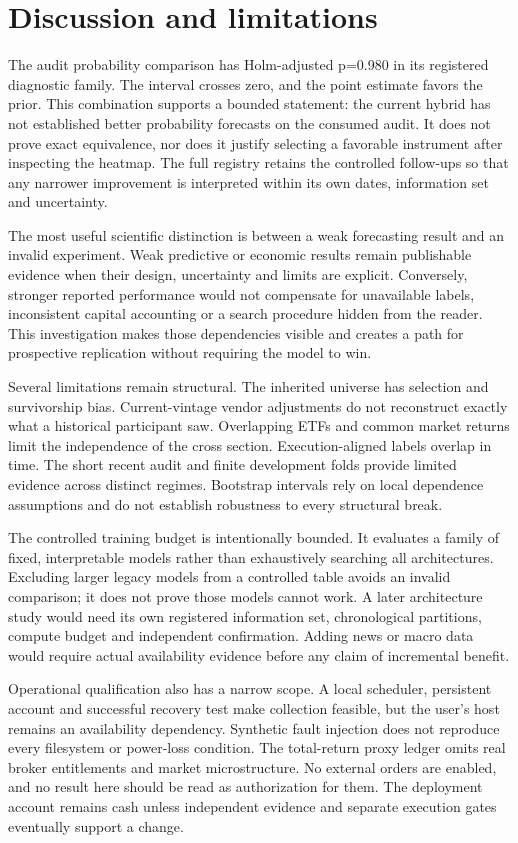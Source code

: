 \section{Discussion and limitations}\label{sec:section-11}

The audit probability comparison has Holm-adjusted p=0.980 in its registered diagnostic family. The interval crosses zero, and the point estimate favors the prior. This combination supports a bounded statement: the current hybrid has not established better probability forecasts on the consumed audit. It does not prove exact equivalence, nor does it justify selecting a favorable instrument after inspecting the heatmap. The full registry retains the controlled follow-ups so that any narrower improvement is interpreted within its own dates, information set and uncertainty.

The most useful scientific distinction is between a weak forecasting result and an invalid experiment. Weak predictive or economic results remain publishable evidence when their design, uncertainty and limits are explicit. Conversely, stronger reported performance would not compensate for unavailable labels, inconsistent capital accounting or a search procedure hidden from the reader. This investigation makes those dependencies visible and creates a path for prospective replication without requiring the model to win.

Several limitations remain structural. The inherited universe has selection and survivorship bias. Current-vintage vendor adjustments do not reconstruct exactly what a historical participant saw. Overlapping ETFs and common market returns limit the independence of the cross section. Execution-aligned labels overlap in time. The short recent audit and finite development folds provide limited evidence across distinct regimes. Bootstrap intervals rely on local dependence assumptions and do not establish robustness to every structural break.

The controlled training budget is intentionally bounded. It evaluates a family of fixed, interpretable models rather than exhaustively searching all architectures. Excluding larger legacy models from a controlled table avoids an invalid comparison; it does not prove those models cannot work. A later architecture study would need its own registered information set, chronological partitions, compute budget and independent confirmation. Adding news or macro data would require actual availability evidence before any claim of incremental benefit.

Operational qualification also has a narrow scope. A local scheduler, persistent account and successful recovery test make collection feasible, but the user's host remains an availability dependency. Synthetic fault injection does not reproduce every filesystem or power-loss condition. The total-return proxy ledger omits real broker entitlements and market microstructure. No external orders are enabled, and no result here should be read as authorization for them. The deployment account remains cash unless independent evidence and separate execution gates eventually support a change.

